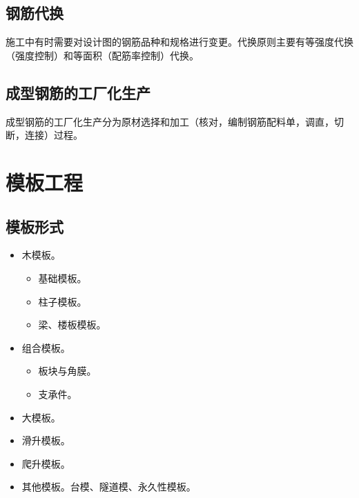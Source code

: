 \documentclass{book}
\begin{document}
\subsection{钢筋代换}
\par 施工中有时需要对设计图的钢筋品种和规格进行变更。代换原则主要有等强度代换（强度控制）和等面积（配筋率控制）代换。
\subsection{成型钢筋的工厂化生产}
\par 成型钢筋的工厂化生产分为原材选择和加工（核对，编制钢筋配料单，调直，切断，连接）过程。
\section{模板工程}
\subsection{模板形式}
\begin{itemize}
    \item 木模板。
          \begin{itemize}
              \item 基础模板。
              \item 柱子模板。
              \item 梁、楼板模板。
          \end{itemize}
    \item 组合模板。
          \begin{itemize}
              \item 板块与角膜。
              \item 支承件。
          \end{itemize}
    \item 大模板。
    \item 滑升模板。
    \item 爬升模板。
    \item 其他模板。台模、隧道模、永久性模板。
\end{itemize}
\end{document}
